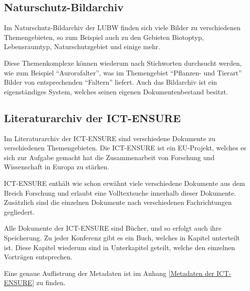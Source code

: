 \subsection{Naturschutz-Bildarchiv} \label{Bilddatenbank}
Im Naturschutz-Bildarchiv der \ac{LUBW} finden sich viele Bilder zu verschiedenen Themengebieten, so zum Beispiel auch zu den Gebieten Biotoptyp, Lebensraumtyp, Naturschutzgebiet und einige mehr.
\cite{Naturschutz-Bildarchiv}

Diese Themenkomplexe k\"onnen wiederum nach Stichworten durchsucht werden, wie zum Beispiel "`Aurorafalter"', was im Themengebiet "`Pflanzen- und Tierart"' Bilder von entsprechenden "`Faltern"' liefert. Auch das Bildarchiv ist ein eigenst\"andiges System, welches seinen eigenen Dokumentenbestand besitzt.

\subsection{Literaturarchiv der ICT-ENSURE}
Im Literaturarchiv der \ac{ICT-ENSURE} sind verschiedene Dokumente zu verschiedenen Themengebieten. Die \ac{ICT-ENSURE} ist ein EU-Projekt, welches es sich zur Aufgabe gemacht hat die Zusammenarbeit von Forschung und Wissenschaft in Europa zu st\"arken.

\ac{ICT-ENSURE} enth\"alt wie schon erw\"ahnt viele verschiedene Dokumente aus dem Breich Forschung und erlaubt eine Volltextsuche innerhalb dieser Dokumente. Zus\"atzlich sind die einzelnen Dokumente nach verschiedenen Fachrichtungen gegliedert.
\cite{ICT-ENSURE_Bericht}

Alle Dokumente der \ac{ICT-ENSURE} sind B\"ucher, und so erfolgt auch ihre Speicherung.
Zu jeder Konferenz gibt es ein Buch, welches in Kapitel unterteilt ist. Diese Kapitel wiederum sind in Unterkapitel geteilt, welche den einzelnen Vortr\"agen entsprechen.

Eine genaue Auflistrung der Metadaten ist im Anhang \ref{Metadaten der ICT-ENSURE} zu finden.
